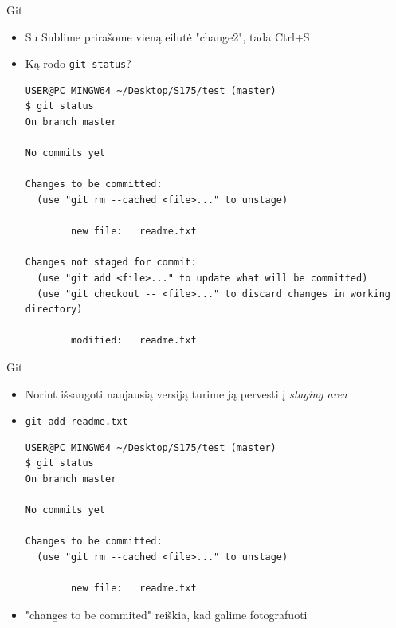 \documentclass[11pt,xcolor=table]{beamer}
\begin{document}
\begin{frame}[fragile]{Git}
\begin{itemize}
\item Su Sublime prirašome vieną eilutė "change2", tada Ctrl+S
\item Ką rodo \colorbox{listinggray}{\lstinline|git status|}?
\begin{lstlisting}
USER@PC MINGW64 ~/Desktop/S175/test (master)
$ git status
On branch master

No commits yet

Changes to be committed:
  (use "git rm --cached <file>..." to unstage)

        new file:   readme.txt

Changes not staged for commit:
  (use "git add <file>..." to update what will be committed)
  (use "git checkout -- <file>..." to discard changes in working directory)

        modified:   readme.txt
\end{lstlisting}
\end{itemize}
\end{frame}

\begin{frame}[fragile]{Git}
\begin{itemize}
\item Norint išsaugoti naujausią versiją turime ją pervesti į \textit{staging area}
\item \colorbox{listinggray}{\lstinline|git add readme.txt|}
\begin{lstlisting}
USER@PC MINGW64 ~/Desktop/S175/test (master)
$ git status
On branch master

No commits yet

Changes to be committed:
  (use "git rm --cached <file>..." to unstage)

        new file:   readme.txt
\end{lstlisting}
\item "changes to be commited" reiškia, kad galime fotografuoti
\end{itemize}
\end{frame}
\end{document}
